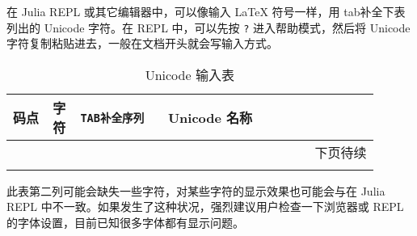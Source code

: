 \documentclass[
  UTF8, %
  a4paper,  %
  oneside,  %
]{ctexbook} %
\begin{document}
在 Julia REPL 或其它编辑器中，可以像输入 LaTeX 符号一样，用 tab补全下表列出的 Unicode 字符。在 REPL 中，可以先按 \texttt{?} 进入帮助模式，然后将 Unicode 字符复制粘贴进去，一般在文档开头就会写输入方式。


\begin{longtable}{p{0.1\linewidth}p{0.05\linewidth}p{0.22\linewidth}p{0.53\linewidth}}
  \caption{Unicode 输入表} \\
  \toprule
  \bf{码点} & \bf{字符} & \tt{TAB}\bf{补全序列} & \bf{Unicode 名称} \\
  \hline \endhead
  \multicolumn{4}{r}{下页待续} \\ 
  \midrule \endfoot
  \bottomrule \endlastfoot

  
  
  \bottomrule
\end{longtable}

此表第二列可能会缺失一些字符，对某些字符的显示效果也可能会与在 Julia REPL 中不一致。如果发生了这种状况，强烈建议用户检查一下浏览器或 REPL 的字体设置，目前已知很多字体都有显示问题。
\end{document}
